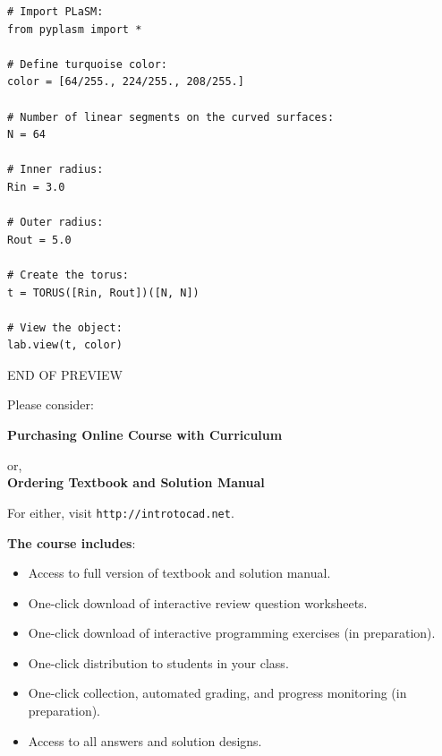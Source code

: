 \documentclass{article}
\newif\iffullversion
\begin{document}
\begin{verbatim}
# Import PLaSM:
from pyplasm import *

# Define turquoise color:
color = [64/255., 224/255., 208/255.]

# Number of linear segments on the curved surfaces:
N = 64

# Inner radius:
Rin = 3.0

# Outer radius:
Rout = 5.0

# Create the torus:
t = TORUS([Rin, Rout])([N, N])

# View the object:
lab.view(t, color)
\end{verbatim}


\newpage
\iffullversion
\else
\vbox{}
\vfill
\pagestyle{empty}
    \begin{center}
    {\huge \color{red}END OF PREVIEW}\\[2cm]

\centerline{\Large Please consider:}
\vspace{1cm}

{\Large \bf Purchasing Online Course with Curriculum}
\vspace{1cm}

    {\Large or,}\\[1cm]

{\Large \bf Ordering Textbook and Solution Manual}
\vspace{1cm}

    {\Large For either, visit {\tt http://introtocad.net}. \\[2cm]
}
\end{center}
{\bf The course includes}:
\begin{itemize}
\item Access to full version of textbook and solution manual.
\item One-click download of interactive review question worksheets.
\item One-click download of interactive programming exercises (in preparation).
\item One-click distribution to students in your class.
\item One-click collection, automated grading, and progress monitoring (in preparation).
\item Access to all answers and solution designs.
\end{itemize}

\vfill
    
\end{document}
